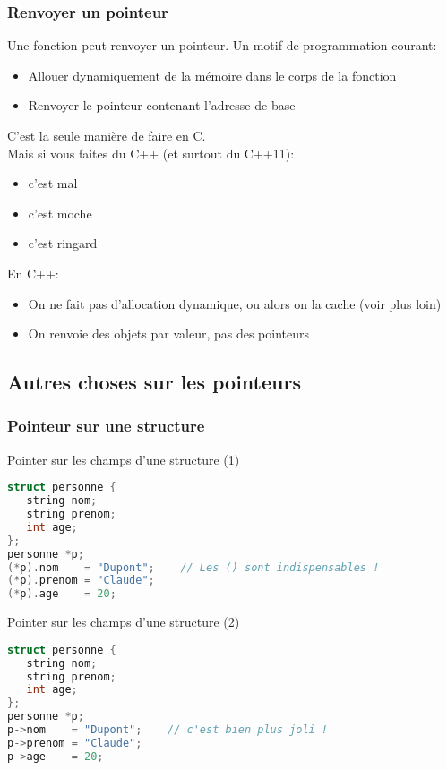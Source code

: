 \documentclass{beamer}
\begin{document}
\begin{frame}[fragile=singleslide,shrink=20]
\frametitle{Renvoyer un pointeur}
Une fonction peut renvoyer un pointeur. Un motif de programmation courant:
\begin{itemize}
\item{Allouer dynamiquement de la mémoire dans le corps de la fonction}
\item{Renvoyer le pointeur contenant l'adresse de base}
\end{itemize}

C'est la seule manière de faire en C. \\
Mais si vous faites du C++ (et surtout du C++11):

\begin{itemize}
\item{c'est mal}
\item{c'est moche}
\item{c'est ringard}
\end{itemize}

En C++: 

\begin{itemize}
\item{On ne fait pas d'allocation dynamique, ou alors on la cache (voir plus loin)}
\item{On renvoie des objets par valeur, pas des pointeurs}
\end{itemize}
\end{frame}

\subsection{Autres choses sur les pointeurs}

\begin{frame}[fragile=singleslide,shrink=20]
\frametitle{Pointeur sur une structure}
\begin{block}{Pointer sur les champs d'une structure (1)}
\begin{lstlisting}[language=c++]
struct personne {
   string nom;
   string prenom;
   int age;
};
personne *p;
(*p).nom    = "Dupont";    // Les () sont indispensables !
(*p).prenom = "Claude";
(*p).age    = 20;
\end{lstlisting}
\end{block}

\begin{block}{Pointer sur les champs d'une structure (2)}
\begin{lstlisting}[language=c++]
struct personne {
   string nom;
   string prenom;
   int age;
};
personne *p;
p->nom    = "Dupont";    // c'est bien plus joli !
p->prenom = "Claude";
p->age    = 20;
\end{lstlisting}
\end{block}
\end{frame}
\end{document}
